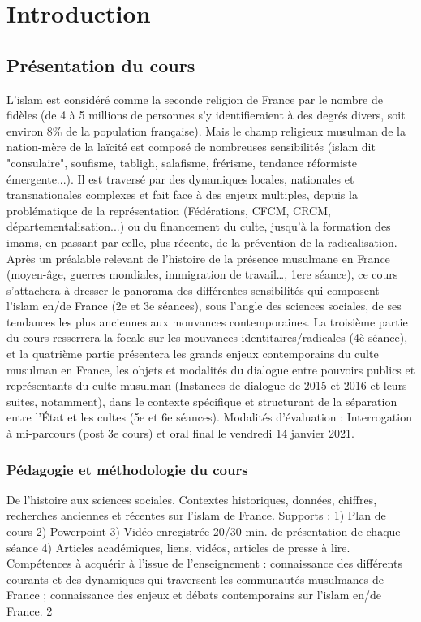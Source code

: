 \chapter{Introduction}


\section{Présentation du cours} 
L’islam est considéré comme la seconde religion de France par
le nombre de fidèles (de 4 à 5 millions de personnes s'y identifieraient à des degrés
divers, soit environ 8\% de la population française). Mais le champ religieux musulman
de la nation-mère de la laïcité est composé de nombreuses sensibilités (islam dit
"consulaire", soufisme, tabligh, salafisme, frérisme, tendance réformiste émergente...).
Il est traversé par des dynamiques locales, nationales et transnationales complexes et
fait face à des enjeux multiples, depuis la problématique de la représentation
(Fédérations, CFCM, CRCM, départementalisation...) ou du financement du culte,
jusqu'à la formation des imams, en passant par celle, plus récente, de la prévention de la
radicalisation. Après un préalable relevant de l’histoire de la présence musulmane en
France (moyen-âge, guerres mondiales, immigration de travail…, 1ere séance), ce cours
s'attachera à dresser le panorama des différentes sensibilités qui composent l'islam en/de
France (2e et 3e
séances), sous l’angle des sciences sociales, de ses tendances les plus
anciennes aux mouvances contemporaines. La troisième partie du cours resserrera la
focale sur les mouvances identitaires/radicales (4è séance), et la quatrième partie
présentera les grands enjeux contemporains du culte musulman en France, les objets et
modalités du dialogue entre pouvoirs publics et représentants du culte musulman
(Instances de dialogue de 2015 et 2016 et leurs suites, notamment), dans le contexte
spécifique et structurant de la séparation entre l’État et les cultes (5e
et 6e
séances).
Modalités d’évaluation : Interrogation à mi-parcours (post 3e
cours) et oral final le
vendredi 14 janvier 2021.


\subsection{Pédagogie et méthodologie du cours}
De l’histoire aux sciences sociales. Contextes
historiques, données, chiffres, recherches anciennes et récentes sur l’islam de France.
Supports : 1) Plan de cours 2) Powerpoint 3) Vidéo enregistrée 20/30 min. de
présentation de chaque séance 4) Articles académiques, liens, vidéos, articles de presse
à lire.
Compétences à acquérir à l’issue de l’enseignement : connaissance des différents
courants et des dynamiques qui traversent les communautés musulmanes de France ;
connaissance des enjeux et débats contemporains sur l’islam en/de France. 
2
